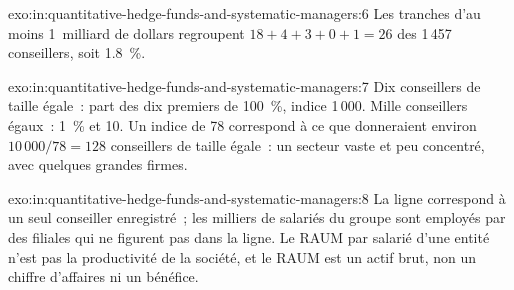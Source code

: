 \begin{solution}{exo:in:quantitative-hedge-funds-and-systematic-managers:6}
Les tranches d'au moins 1~milliard de dollars regroupent $18+4+3+0+1=26$ des 1\,457 conseillers, soit 1.8~\%.
\end{solution}

\begin{solution}{exo:in:quantitative-hedge-funds-and-systematic-managers:7}
Dix conseillers de taille égale~: part des dix premiers de 100~\%, indice 1\,000. Mille conseillers égaux~: 1~\% et 10. Un indice de 78 correspond à ce que donneraient environ
$10\,000/78=128$ conseillers de taille égale~: un secteur vaste et peu concentré, avec quelques grandes firmes.
\end{solution}

\begin{solution}{exo:in:quantitative-hedge-funds-and-systematic-managers:8}
La ligne correspond à un seul conseiller enregistré~; les milliers de salariés du groupe sont employés par des filiales qui ne figurent pas dans la ligne.
Le RAUM par salarié d'une entité n'est pas la productivité de la société, et le RAUM est un actif brut, non un chiffre d'affaires ni un bénéfice.
\end{solution}

